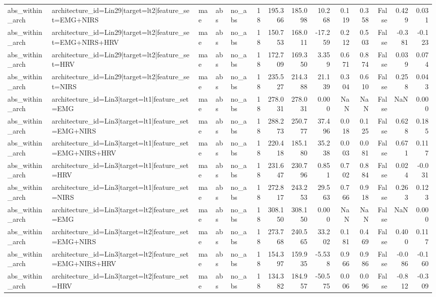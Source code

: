 \begin{table}
\begin{tabular}{lllllrrrrrrrrr}
abs_within_arch & architecture_id=Lin29|target=lt2|feature_set=EMG+NIRS & mae & abs & no_abs & 18 & 195.366 & 185.098 & 10.268 & 0.119 & 0.358 & False & 0.429 & 0.031 \\
abs_within_arch & architecture_id=Lin29|target=lt2|feature_set=EMG+NIRS+HRV & mae & abs & no_abs & 18 & 150.753 & 168.011 & -17.259 & 0.212 & 0.503 & False & -0.381 & -0.123 \\
abs_within_arch & architecture_id=Lin29|target=lt2|feature_set=HRV & mae & abs & no_abs & 18 & 172.709 & 169.350 & 3.359 & 0.671 & 0.874 & False & 0.039 & 0.074 \\
abs_within_arch & architecture_id=Lin29|target=lt2|feature_set=NIRS & mae & abs & no_abs & 18 & 235.527 & 214.388 & 21.139 & 0.304 & 0.610 & False & 0.258 & 0.043 \\
abs_within_arch & architecture_id=Lin3|target=lt1|feature_set=EMG & mae & abs & no_abs & 18 & 278.031 & 278.031 & 0.000 & NaN & NaN & False & NaN & 0.000 \\
abs_within_arch & architecture_id=Lin3|target=lt1|feature_set=EMG+NIRS & mae & abs & no_abs & 18 & 288.273 & 250.777 & 37.496 & 0.018 & 0.125 & False & 0.628 & 0.185 \\
abs_within_arch & architecture_id=Lin3|target=lt1|feature_set=EMG+NIRS+HRV & mae & abs & no_abs & 18 & 220.418 & 185.180 & 35.238 & 0.003 & 0.081 & False & 0.671 & 0.117 \\
abs_within_arch & architecture_id=Lin3|target=lt1|feature_set=HRV & mae & abs & no_abs & 18 & 231.647 & 230.796 & 0.851 & 0.702 & 0.884 & False & 0.024 & -0.031 \\
abs_within_arch & architecture_id=Lin3|target=lt1|feature_set=NIRS & mae & abs & no_abs & 18 & 272.817 & 243.253 & 29.563 & 0.766 & 0.918 & False & 0.263 & 0.123 \\
abs_within_arch & architecture_id=Lin3|target=lt2|feature_set=EMG & mae & abs & no_abs & 18 & 308.150 & 308.150 & 0.000 & NaN & NaN & False & NaN & 0.000 \\
abs_within_arch & architecture_id=Lin3|target=lt2|feature_set=EMG+NIRS & mae & abs & no_abs & 18 & 273.768 & 240.565 & 33.202 & 0.181 & 0.469 & False & 0.400 & 0.117 \\
abs_within_arch & architecture_id=Lin3|target=lt2|feature_set=EMG+NIRS+HRV & mae & abs & no_abs & 18 & 154.397 & 159.935 & -5.538 & 0.966 & 0.986 & False & -0.086 & -0.160 \\
abs_within_arch & architecture_id=Lin3|target=lt2|feature_set=HRV & mae & abs & no_abs & 18 & 134.382 & 184.957 & -50.575 & 0.006 & 0.096 & False & -0.812 & -0.309 \\

\end{tabular}
\end{table}
